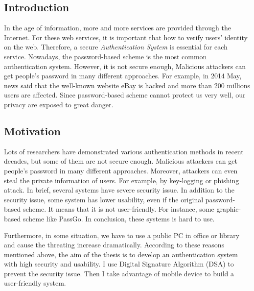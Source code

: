 
\begin{CJK}{Bg5}{bsmi}



\chapter{Introduction}

In the age of information, more and more services are provided through the Internet. For these web services, it is important that how to verify users' identity on the web. Therefore, a secure \emph{Authentication System} is essential for each service. Nowadays, the password-based scheme is the most common authentication system. However, it is not secure enough\cite{password-security}, Malicious attackers can get people's password in many different approaches. For example, in 2014 May, news said that the well-known website eBay is hacked and more than 200 millions users are affected\cite{ebay-hack}. Since password-based scheme cannot protect us very well, our privacy are exposed to great danger.

\section{Motivation}

Lots of researchers have demonstrated various authentication methods in recent decades, but some of them are not secure enough. Malicious attackers can get people's password in many different approaches. Moreover, attackers can even steal the private information of users. For example, by key-logging or phishing attack. In brief, several systems have severe security issue. In addition to the security issue, some system has lower usability, even if the original password-based scheme\cite{password-usability}. It means that it is not user-friendly. For instance, some graphic-based scheme like PassGo\cite{passgo}. In conclusion, these systems is hard to use.

Furthermore, in some situation, we have to use a public PC in office or library and cause the threating increase dramatically. According to these reasons mentioned above, the aim of the thesis is to develop an authentication system with high security and usability. I use Digital Signature Algorithm (DSA) to prevent the security issue. Then I take advantage of mobile device to build a user-friendly system.


\end{CJK}
